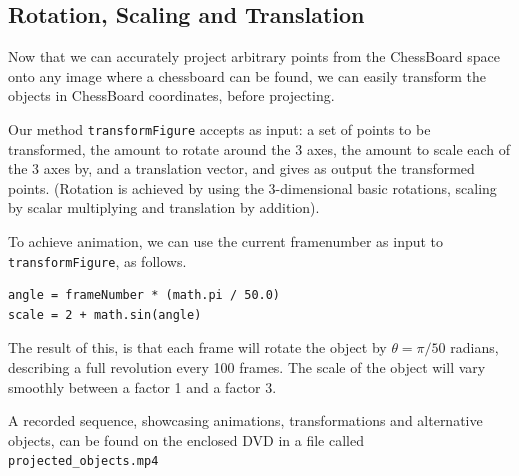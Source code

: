 \documentclass[a4paper,11pt]{article}
\begin{document}
\subsection{Rotation, Scaling and Translation}
Now that we can accurately project arbitrary points from the ChessBoard space onto any image where a chessboard can be found, we can easily transform the objects in ChessBoard coordinates, before projecting.

Our method \texttt{transformFigure} accepts as input: a set of points to be transformed, the amount to rotate around the 3 axes, the amount to scale each of the 3 axes by, and a translation vector, and gives as output the transformed points. (Rotation is achieved by using the 3-dimensional basic rotations, scaling by scalar multiplying and translation by addition).

To achieve animation, we can use the current framenumber as input to \texttt{transformFigure}, as follows.

\begin{lstlisting}
angle = frameNumber * (math.pi / 50.0)
scale = 2 + math.sin(angle)
\end{lstlisting}

The result of this, is that each frame will rotate the object by $\theta = \pi / 50$ radians, describing a full revolution every 100 frames. The scale of the object will vary smoothly between a factor 1 and a factor 3.

A recorded sequence, showcasing animations, transformations and alternative objects, can be found on the enclosed DVD in a file called \texttt{projected\_objects.mp4}
\end{document}
